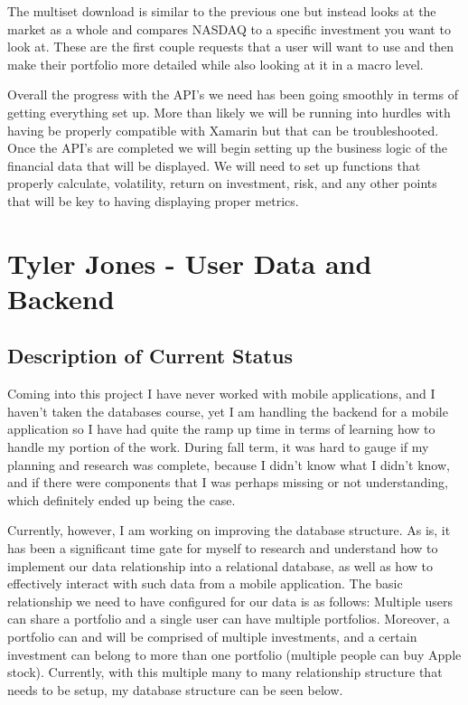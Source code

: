 \documentclass[letterpaper,10pt,titlepage,journal,compsoc,draftclsnofoot,onecolumn]{IEEEtran}
\begin{document}
The multiset download is similar to the previous one but instead looks at the market as a whole and compares NASDAQ to a specific investment you want to look at. These are the first couple requests that a user will want to use and then make their portfolio more detailed while also looking at it in a macro level. 

Overall the progress with the API's we need has been going smoothly in terms of getting everything set up. More than likely we will be running into hurdles with having be properly compatible with Xamarin but that can be troubleshooted. Once the API's are completed we will begin setting up the business logic of the financial data that will be displayed. We will need to set up functions that properly calculate, volatility, return on investment, risk, and any other points that will be key to having displaying proper metrics. 

\section{Tyler Jones - User Data and Backend}

\subsection{Description of Current Status}
 Coming into this project I have never worked with mobile applications, and I haven't taken the databases course, yet I am handling the backend for a mobile application so I have had quite the ramp up time in terms of learning how to handle my portion of the work. During fall term, it was hard to gauge if my planning and research was complete, because I didn't know what I didn't know, and if there were components that I was perhaps missing or not understanding, which definitely ended up being the case. 

Currently, however, I am working on improving the database structure. As is, it has been a significant time gate for myself to research and understand how to implement our data relationship into a relational database, as well as how to effectively interact with such data from a mobile application. The basic relationship we need to have configured for our data is as follows: Multiple users can share a portfolio and a single user can have multiple portfolios. Moreover, a portfolio can and will be comprised of multiple investments, and a certain investment can belong to more than one portfolio (multiple people can buy Apple stock). Currently, with this multiple many to many relationship structure that needs to be setup, my database structure can be seen below.
\end{document}
